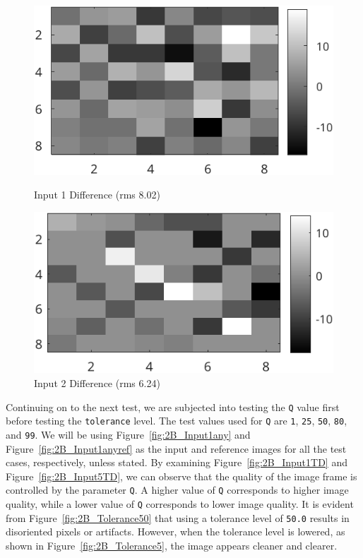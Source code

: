 \documentclass{article}
\begin{document}
	
	\begin{figure}[ht]
  	\centering
  	\begin{minipage}[t]{0.45\textwidth}
    	\centering
    	\includegraphics[width=\textwidth]{2B_Diff1}
    	\caption{Input 1 Difference (rms 8.02)}
    	\label{fig:2B_Diff1}
  	\end{minipage}\hfill
  	\begin{minipage}[t]{0.45\textwidth}
    	\centering
    	\includegraphics[width=\textwidth]{2B_Diff2}
    	\caption{Input 2 Difference (rms 6.24)}
    	\label{fig:2B_Diff2}
  	\end{minipage}
	\end{figure}

	Continuing on to the next test, we are subjected into testing the {\texttt{Q}} value first before testing the {\texttt{tolerance}} level. The test values used for {\texttt{Q}} are 
	{\texttt{1}}, {\texttt{25}}, {\texttt{50}}, {\texttt{80}}, and {\texttt{99}}. We will be using {Figure~\ref{fig:2B_Input1any}} and {Figure~\ref{fig:2B_Input1anyref}} as the input and reference 
	images for all the test	cases, respectively, unless stated. By examining {Figure~\ref{fig:2B_Input1TD}} and {Figure~\ref{fig:2B_Input5TD}}, we can observe that the quality of the image frame 
	is controlled by the parameter {\texttt{Q}}. A higher value of {\texttt{Q}} corresponds to higher image quality, while a lower value of {\texttt{Q}} corresponds to lower image quality. 
	It is evident from {Figure~\ref{fig:2B_Tolerance50}} that using a tolerance level of {\texttt{50.0}} results in disoriented pixels or artifacts. However, when the tolerance level is lowered, 
	as shown in	{Figure~\ref{fig:2B_Tolerance5}}, the image appears cleaner and clearer.
\end{document}
